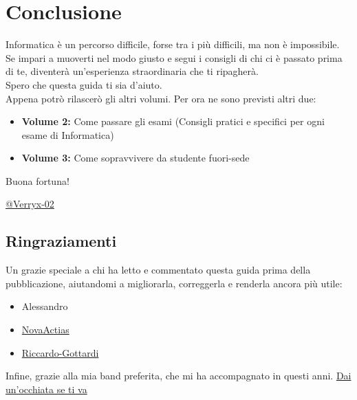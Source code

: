 \documentclass[18pt]{extarticle}
\begin{document}
\section{Conclusione}
Informatica è un percorso difficile, forse tra i più difficili, ma non è impossibile.\\
Se impari a muoverti nel modo giusto e segui i consigli di chi ci è passato prima di te, diventerà un'esperienza straordinaria che ti ripagherà.\\
Spero che questa guida ti sia d'aiuto.\\
Appena potrò rilascerò gli altri volumi. Per ora ne sono previsti altri due:
\begin{itemize}
\item \textbf{Volume 2:} Come passare gli esami (Consigli pratici e specifici per ogni esame di Informatica)
\item \textbf{Volume 3:} Come sopravvivere da studente fuori-sede
\end{itemize}

Buona fortuna!

\vspace{1cm}
\begin{flushright}
\href{https://github.com/Verryx-02}{@Verryx-02}
\end{flushright}

\subsection*{Ringraziamenti}
Un grazie speciale a chi ha letto e commentato questa guida prima della pubblicazione, aiutandomi a migliorarla, correggerla e renderla ancora più utile:
\begin{itemize}
\item Alessandro
\item \href{https://github.com/NovaActias}{NovaActias}
\item \href{https://github.com/Riccardo-Gottardi}{Riccardo-Gottardi}

\end{itemize}%
Infine, grazie alla mia band preferita, che mi ha accompagnato in questi anni. \href{https://www.youtube.com/watch?v=0dG9pXeOgT0}{Dai un'occhiata se ti va}
\end{document}
